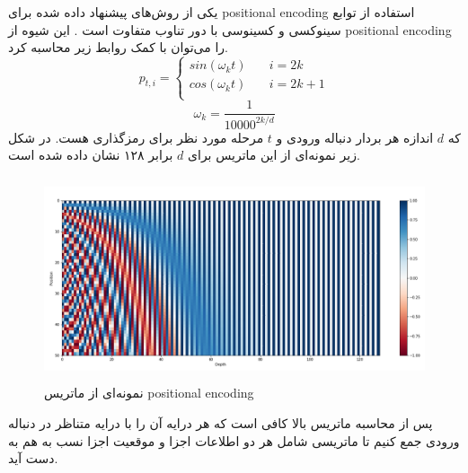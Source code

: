 یکی از روش‌های پیشنهاد داده شده برای \gls{positional encoding} استفاده از توابع
سینوکسی و کسینوسی با دور تناوب متفاوت است \cite{vaswani2017attention}. این شیوه
از \gls{positional encoding} را می‌توان با کمک روابط زیر محاسبه کرد.
\begin{equation}
    p_{t, i} =
    \begin{cases}
        sin(\omega_k t) &\quad i = 2k\\
        cos(\omega_k t) &\quad i = 2k+1\\
    \end{cases}
\end{equation}
\begin{equation}
    \omega_k = \frac{1}{10000^{2k/d}}
\end{equation}
که $d$ اندازه هر بردار دنباله ورودی و $t$ مرحله مورد نظر برای رمزگذاری هست. در
شکل زیر نمونه‌ای از این ماتریس برای $d$ برابر ۱۲۸ نشان داده شده است.
\begin{figure}[ht]
    \centering
    \includegraphics[height=6cm]{./statics/positional_encoding.png}
    \caption{نمونه‌ای از ماتریس \gls{positional encoding}}
\end{figure}

پس از محاسبه ماتریس بالا کافی است که هر درایه آن را با درایه متناظر در دنباله
ورودی جمع کنیم تا ماتریسی شامل هر دو اطلاعات اجزا و موقعیت اجزا نسب به هم به دست
آید.